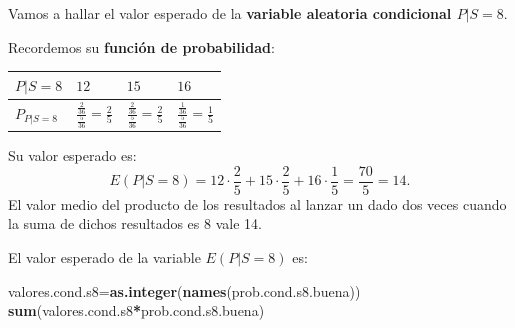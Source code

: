 \documentclass[]{book}
\newenvironment{Shaded}{\begin{snugshade}}{\end{snugshade}}
\newcommand{\KeywordTok}[1]{\textcolor[rgb]{0.13,0.29,0.53}{\textbf{#1}}}
\newcommand{\NormalTok}[1]{#1}
\newcommand{\OperatorTok}[1]{\textcolor[rgb]{0.81,0.36,0.00}{\textbf{#1}}}
\begin{document}
Vamos a hallar el valor esperado de la \textbf{variable aleatoria condicional \(P|S=8\)}.

Recordemos su \textbf{función de probabilidad}:

\begin{longtable}[]{@{}llll@{}}
\toprule
\begin{minipage}[b]{0.22\columnwidth}\raggedright
\(P|S=8\)\strut
\end{minipage} & \begin{minipage}[b]{0.22\columnwidth}\raggedright
\(12\)\strut
\end{minipage} & \begin{minipage}[b]{0.22\columnwidth}\raggedright
\(15\)\strut
\end{minipage} & \begin{minipage}[b]{0.22\columnwidth}\raggedright
\(16\)\strut
\end{minipage}\tabularnewline
\midrule
\endhead
\begin{minipage}[t]{0.22\columnwidth}\raggedright
\(P_{P|S=8}\)\strut
\end{minipage} & \begin{minipage}[t]{0.22\columnwidth}\raggedright
\(\frac{\frac{2}{36}}{\frac{5}{36}}=\frac{2}{5}\)\strut
\end{minipage} & \begin{minipage}[t]{0.22\columnwidth}\raggedright
\(\frac{\frac{2}{36}}{\frac{5}{36}}=\frac{2}{5}\)\strut
\end{minipage} & \begin{minipage}[t]{0.22\columnwidth}\raggedright
\(\frac{\frac{1}{36}}{\frac{5}{36}}=\frac{1}{5}\)\strut
\end{minipage}\tabularnewline
\bottomrule
\end{longtable}

Su valor esperado es:
\[
E(P|S=8)=12\cdot \frac{2}{5}+15\cdot \frac{2}{5}+16\cdot \frac{1}{5}=\frac{70}{5}=14.
\]
El valor medio del producto de los resultados al lanzar un dado dos veces cuando la suma de dichos resultados es 8 vale 14.

El valor esperado de la variable \(E(P|S=8)\) es:

\begin{Shaded}
\begin{Highlighting}[]
\NormalTok{valores.cond.s8=}\KeywordTok{as.integer}\NormalTok{(}\KeywordTok{names}\NormalTok{(prob.cond.s8.buena))}
\KeywordTok{sum}\NormalTok{(valores.cond.s8}\OperatorTok{*}\NormalTok{prob.cond.s8.buena)}
\end{Highlighting}
\end{Shaded}
\end{document}
